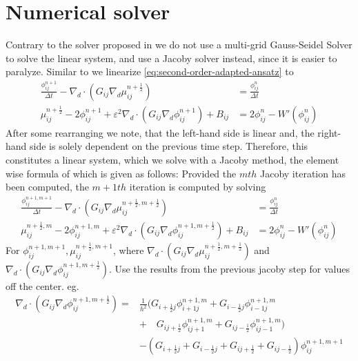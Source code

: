 \documentclass{mimosis}
\begin{document}
\chapter{Numerical solver}
\label{sec:orgeeaed4d}
Contrary to the solver proposed in\autocite{Ulmer_CHRelaxed_2024} we do not use a multi-grid Gauss-Seidel Solver to solve the linear system, and use a Jacoby solver instead, since it is easier to paralyze.
Similar to \autocite{Ulmer_CHRelaxed_2024} we linearize \eqref{eq:second-order-adapted-ansatz} to
\begin{equation}
\begin{aligned}
\frac{\phi_{ij}^{n+1}}{\Delta t}  -  \nabla _d \cdot (G_{ij} \nabla_d \mu_{ij}^{n+\frac{1}{2}} ) &= \frac{ \phi_{ij}^n}{\Delta t}  \\
 \mu_{ij}^{n+\frac{1}{2}} - 2\phi_{ij}^{n+1} + \varepsilon^2  \nabla_d \cdot  (G_{ij} \nabla _d \phi_{ij}^{n+1} ) + B_{ij} &=2\phi _{ij}^n - W'(\phi_{ij}^n)
\end{aligned}
\end{equation}
After some rearranging we note, that the left-hand side is linear and, the right-hand side is solely dependent on the previous time step. Therefore, this constitutes a linear system, which we solve with a Jacoby method, the element wise formula of which is given as follows:
Provided the \(mth\) Jacoby iteration has been computed, the \(m+1th\) iteration is computed by solving
\begin{equation}
\begin{aligned}
\frac{\phi_{ij}^{n+1,m+1}}{\Delta t}  -  \nabla _d \cdot (G_{ij} \nabla_d \mu_{ij}^{n+\frac{1}{2},m+\frac{1}{2}} ) &= \frac{ \phi_{ij}^{n}}{\Delta t}  \\
 \mu_{ij}^{n+\frac{1}{2},m} - 2\phi_{ij}^{n+1,m} + \varepsilon^2  \nabla_d \cdot  (G_{ij} \nabla _d \phi_{ij}^{n+1,m+\frac{1}{2}} ) + B_{ij} &=2\phi _{ij}^n - W'(\phi_{ij}^n)
\end{aligned}
\end{equation}
For \(\phi_{ij}^{n+1,m+1} , \mu_{ij}^{n+\frac{1}{2},m+1}\),
where \(\nabla _d \cdot (G_{ij} \nabla_d \mu_{ij}^{n+\frac{1}{2},m+\frac{1}{2}} )\) and \(\nabla_d \cdot  (G_{ij} \nabla _d \phi_{ij}^{n+1,m+\frac{1}{2}} )\).  Use the results from the previous jacoby step for values off the center. eg.
\begin{equation}
\begin{aligned}
 \nabla _d \cdot (G_{ij} \nabla_d \phi_{ij}^{n+1,m+\frac{1}{2}} )  =&
\frac{1}{h^2} (
G_{i+\frac{1}{2}j}\phi_{i+1j}^{n+1,m}
+ G_{i-\frac{1}{2}j}\phi_{i-1j}^{n+1,m} \\
& + \quad G_{ij+\frac{1}{2}}\phi_{ij+1}^{n+1,m}
+ G_{ij-\frac{1}{2}}\phi_{ij-1}^{n+1,m}
 ) \\
& -
\left(
 G_{i+\frac{1}{2}j}
 + G_{i-\frac{1}{2}j}
 + G_{ij+\frac{1}{2}}
 + G_{ij-\frac{1}{2}}
\right)\phi_{ij}^{n+1,m+1}
\end{aligned}
\end{equation}
\end{document}

